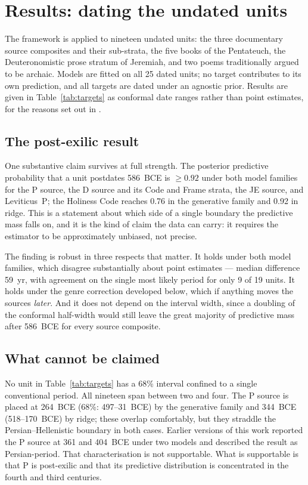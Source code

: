 \section*{Results: dating the undated units}
\label{sec:results}

The framework is applied to nineteen undated units: the three documentary
source composites and their sub-strata, the five books of the Pentateuch,
the Deuteronomistic prose stratum of Jeremiah, and two poems traditionally
argued to be archaic.  Models are fitted on all 25 dated units; no target
contributes to its own prediction, and all targets are dated under an
agnostic prior.  Results are given in Table~\ref{tab:targets} as conformal
date ranges rather than point estimates, for the reasons set out in
.

\subsection*{The post-exilic result}

One substantive claim survives at full strength.  The posterior predictive
probability that a unit postdates 586~BCE is $\geq 0.92$ under both model
families for the P source, the D source and its Code and Frame strata, the
JE source, and Leviticus~P; the Holiness Code reaches 0.76 in the
generative family and 0.92 in ridge.  This is a statement about which side
of a single boundary the predictive mass falls on, and it is the kind of
claim the data can carry: it requires the estimator to be approximately
unbiased, not precise.

The finding is robust in three respects that matter.  It holds under both
model families, which disagree substantially about point estimates ---
median difference 59~yr, with agreement on the single most likely period
for only 9 of 19 units.  It holds under the genre correction developed
below, which if anything moves the sources \emph{later}.  And it does not
depend on the interval width, since a doubling of the conformal half-width
would still leave the great majority of predictive mass after 586~BCE for
every source composite.

\subsection*{What cannot be claimed}

No unit in Table~\ref{tab:targets} has a 68\% interval confined to a
single conventional period.  All nineteen span between two and four.  The
P source is placed at 264~BCE (68\%: 497--31~BCE) by the generative family
and 344~BCE (518--170~BCE) by ridge; these overlap comfortably, but they
straddle the Persian--Hellenistic boundary in both cases.  Earlier versions
of this work reported the P source at 361 and 404~BCE under two models and
described the result as Persian-period.  That characterisation is not
supportable.  What is supportable is that P is post-exilic and that its
predictive distribution is concentrated in the fourth and third centuries.

